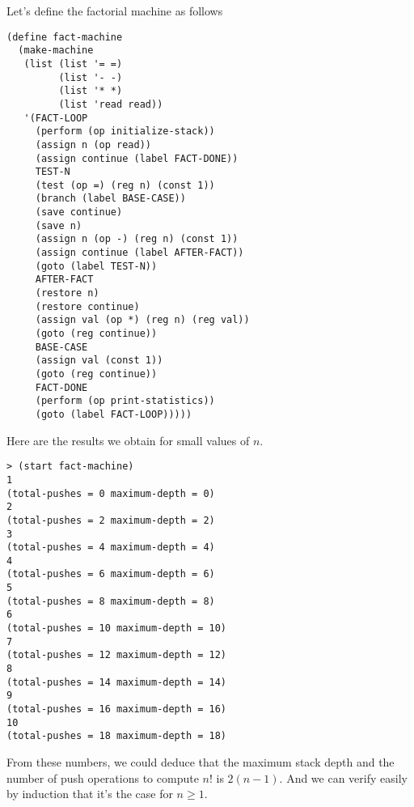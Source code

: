 \documentclass[a4paper,12pt]{article}
\begin{document}
Let's define the factorial machine as follows

\begin{lstlisting}
(define fact-machine
  (make-machine
   (list (list '= =)
         (list '- -)
         (list '* *)
         (list 'read read))
   '(FACT-LOOP
     (perform (op initialize-stack))
     (assign n (op read))
     (assign continue (label FACT-DONE))
     TEST-N
     (test (op =) (reg n) (const 1))
     (branch (label BASE-CASE))
     (save continue)
     (save n)
     (assign n (op -) (reg n) (const 1))
     (assign continue (label AFTER-FACT))
     (goto (label TEST-N))
     AFTER-FACT
     (restore n)
     (restore continue)
     (assign val (op *) (reg n) (reg val))
     (goto (reg continue))
     BASE-CASE
     (assign val (const 1))
     (goto (reg continue))
     FACT-DONE
     (perform (op print-statistics))
     (goto (label FACT-LOOP)))))
\end{lstlisting}

Here are the results we obtain for small values of $n$.

\begin{lstlisting}
> (start fact-machine)
1
(total-pushes = 0 maximum-depth = 0)
2
(total-pushes = 2 maximum-depth = 2)
3
(total-pushes = 4 maximum-depth = 4)
4
(total-pushes = 6 maximum-depth = 6)
5
(total-pushes = 8 maximum-depth = 8)
6
(total-pushes = 10 maximum-depth = 10)
7
(total-pushes = 12 maximum-depth = 12)
8
(total-pushes = 14 maximum-depth = 14)
9
(total-pushes = 16 maximum-depth = 16)
10
(total-pushes = 18 maximum-depth = 18)
\end{lstlisting}

From these numbers, we could deduce that the maximum stack depth and
the number of push operations to compute $n!$ is $2(n-1)$.  And we can
verify easily by induction that it's the case for $n\ge1$.
\end{document}

